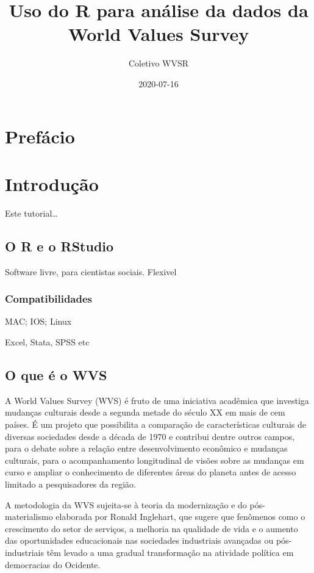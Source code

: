 \documentclass[
  brazil,
]{book}
\title{Uso do R para análise da dados da World Values Survey}
\author{Coletivo WVSR}
\date{2020-07-16}
\begin{document}
\maketitle

{
\setcounter{tocdepth}{1}
\tableofcontents
}
\hypertarget{prefuxe1cio}{%
\chapter{Prefácio}\label{prefuxe1cio}}

\hypertarget{intro}{%
\chapter{Introdução}\label{intro}}

Este tutorial\ldots{}

\hypertarget{o-r-e-o-rstudio}{%
\section{O R e o RStudio}\label{o-r-e-o-rstudio}}

Software livre, para cientistas sociais. Flexivel

\hypertarget{compatibilidades}{%
\subsection{Compatibilidades}\label{compatibilidades}}

MAC; IOS; Linux

Excel, Stata, SPSS etc

\hypertarget{o-que-uxe9-o-wvs}{%
\section{O que é o WVS}\label{o-que-uxe9-o-wvs}}

A World Values Survey (WVS) é fruto de uma iniciativa acadêmica que investiga mudanças culturais desde a segunda metade do século XX em mais de cem países. É um projeto que possibilita a comparação de características culturais de diversas sociedades desde a década de 1970 e contribui dentre outros campos, para o debate sobre a relação entre desenvolvimento econômico e mudanças culturais, para o acompanhamento longitudinal de visões sobre as mudanças em curso e ampliar o conhecimento de diferentes áreas do planeta antes de acesso limitado a pesquisadores da região.

A metodologia da WVS sujeita-se à teoria da modernização e do pós-materialismo elaborada por Ronald Inglehart, que sugere que fenômenos como o crescimento do setor de serviços, a melhoria na qualidade de vida e o aumento das oportunidades educacionais nas sociedades industriais avançadas ou pós-industriais têm levado a uma gradual transformação na atividade política em democracias do Ocidente.
\end{document}
